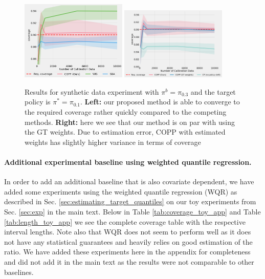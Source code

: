 \begin{figure}[htp!]
    \centering
    \includegraphics[width=0.45\textwidth, height=0.3\textwidth]{figures/copp/cov-n_cal.png}
    \includegraphics[width=0.45\textwidth, height=0.3\textwidth]{figures/copp/ncal-abl.png}
    \caption{Results for synthetic data experiment with $\pi^b = \pi_{0.3}$ and the target policy is $\pi^* = \pi_{0.1}$. \textbf{Left:} our proposed method is able to converge to the required coverage rather quickly compared to the competing methods. \textbf{Right:} here we see that our method is on par with using the GT weights. Due to estimation error, COPP with estimated weights has slightly higher variance in terms of coverage}
    \label{fig:Toy_GT}
\end{figure}

\paragraph{Additional experimental baseline using weighted quantile regression.}
In order to add an additional baseline that is also covariate dependent, we have added some experiments using the weighted quantile regression (WQR) as described in Sec. \ref{sec:estimating_target_quantiles} on our toy experiments from Sec. \ref{sec:exp} in the main text. Below in Table \ref{tab:coverage_toy_app} and Table \ref{tab:length_toy_app} we see the complete coverage table with the respective interval lengths. Note also that WQR does not seem to perform well as it does not have any statistical guarantees and heavily relies on good estimation of the ratio. We have added these experiments here in the appendix for completeness and did not add it in the main text as the results were not comparable to other baselines.

